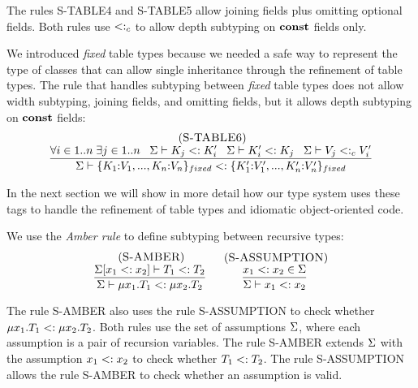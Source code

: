 The rules \textsc{S-TABLE4} and \textsc{S-TABLE5} allow joining fields
plus omitting optional fields.
Both rules use $<:_{c}$ to allow depth subtyping on $\mathbf{const}$ fields only.

We introduced \emph{fixed} table types because we needed a safe way
to represent the type of classes that can allow single inheritance
through the refinement of table types.
The rule that handles subtyping between \emph{fixed} table types
does not allow width subtyping, joining fields, and omitting fields,
but it allows depth subtyping on $\mathbf{const}$ fields:
\[
\begin{array}{c}
\; (\textsc{S-TABLE6})\\
\dfrac{\forall i \in 1..n \; \exists j \in 1..n \;\;\;
       \Sigma \vdash K_{j} <: K_{i}' \;\;\;
       \Sigma \vdash K_{i}' <: K_{j} \;\;\;
       \Sigma \vdash V_{j} <:_{c} V_{i}'}
      {\Sigma \vdash \{K_{1}{:}V_{1}, ..., K_{n}{:}V_{n}\}_{fixed} <:
                    \{K_{1}'{:}V_{1}', ..., K_{n}'{:}V_{n}'\}_{fixed}}
\end{array}
\]

In the next section we will show in more detail how our type system
uses these tags to handle the refinement of table types and idiomatic
object-oriented code.

We use the \emph{Amber rule} \citep{cardelli1986amber} to define
subtyping between recursive types:
\[
\begin{array}{c}
\begin{array}{c}
\; (\textsc{S-AMBER})\\
\dfrac{\Sigma[x_{1} <: x_{2}] \vdash T_{1} <: T_{2}}
      {\Sigma \vdash \mu x_{1}.T_{1} <: \mu x_{2}.T_{2}}
\end{array}
\;
\begin{array}{c}
\; (\textsc{S-ASSUMPTION})\\
\dfrac{x_{1} <: x_{2} \in \Sigma}
      {\Sigma \vdash x_{1} <: x_{2}}
\end{array}
\end{array}
\]

The rule \textsc{S-AMBER} also uses the rule \textsc{S-ASSUMPTION}
to check whether $\mu x_{1}.T_{1} <: \mu x_{2}.T_{2}$.
Both rules use the set of assumptions $\Sigma$,
where each assumption is a pair of recursion variables.
The rule \textsc{S-AMBER} extends $\Sigma$ with the assumption
$x_{1} <: x_{2}$ to check whether $T_{1} <: T_{2}$.
The rule \textsc{S-ASSUMPTION} allows the rule \textsc{S-AMBER}
to check whether an assumption is valid.

